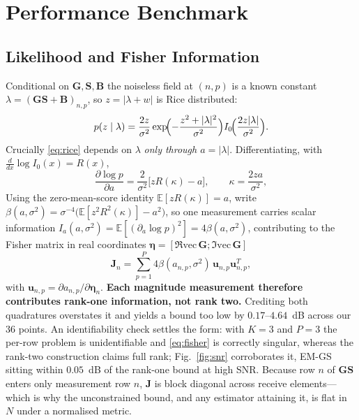 \documentclass[conference]{IEEEtran}
\newcommand{\bG}{\mathbf{G}}
\newcommand{\bS}{\mathbf{S}}
\newcommand{\bB}{\mathbf{B}}
\newcommand{\bJ}{\mathbf{J}}
\begin{document}
\section{Performance Benchmark}\label{sec:crlb}
\subsection{Likelihood and Fisher Information}
Conditional on $\bG,\bS,\bB$ the noiseless field at $(n,p)$ is a known
constant $\lambda=(\bG\bS+\bB)_{n,p}$, so $z=|\lambda+w|$ is Rice distributed:
\begin{equation}\label{eq:rice}
p(z\mid\lambda)=\frac{2z}{\sigma^2}
\exp\!\Bigl(-\frac{z^2+|\lambda|^2}{\sigma^2}\Bigr)
I_0\!\Bigl(\frac{2z|\lambda|}{\sigma^2}\Bigr).
\end{equation}
Crucially \eqref{eq:rice} depends on $\lambda$ \emph{only through
$a=|\lambda|$}. Differentiating, with $\frac{d}{dx}\log I_0(x)=R(x)$,
\begin{equation}\label{eq:score}
\frac{\partial\log p}{\partial a}=\frac{2}{\sigma^2}\bigl[zR(\kappa)-a\bigr],
\qquad \kappa=\frac{2za}{\sigma^2},
\end{equation}
Using the zero-mean-score identity $\mathbb{E}[zR(\kappa)]=a$, write
$\beta(a,\sigma^2)=\sigma^{-4}\bigl(\mathbb{E}[z^{2}R^{2}(\kappa)]-a^{2}\bigr)$,
so one measurement carries scalar information
$I_a(a,\sigma^2)=\mathbb{E}[(\partial_a\log p)^2]=4\beta(a,\sigma^2)$,
contributing to the Fisher matrix in real coordinates
$\boldsymbol{\eta}=[\Re\mathrm{vec}\,\bG;\Im\mathrm{vec}\,\bG]$
\begin{equation}\label{eq:fisher}
\bJ_{n}=\sum_{p=1}^{P}4\beta(a_{n,p},\sigma^2)\,
\mathbf{u}_{n,p}\mathbf{u}_{n,p}^{T},
\end{equation}
with $\mathbf{u}_{n,p}=\partial a_{n,p}/\partial\boldsymbol{\eta}_n$.
\textbf{Each magnitude measurement therefore contributes rank-one information,
not rank two.} Crediting both quadratures overstates it and yields a bound too
low by $0.17$--$4.64$~dB across our $36$ points. An identifiability check
settles the form: with $K=3$ and $P=3$ the per-row problem is unidentifiable
and \eqref{eq:fisher} is correctly singular, whereas the rank-two construction
claims full rank; Fig.~\ref{fig:snr} corroborates it, EM-GS sitting within
$0.05$~dB of the rank-one bound at high SNR. Because row $n$ of $\bG\bS$
enters only measurement row $n$, $\bJ$ is block diagonal across receive
elements---which is why the unconstrained bound, and any estimator attaining
it, is flat in $N$ under a normalised metric.
\end{document}
